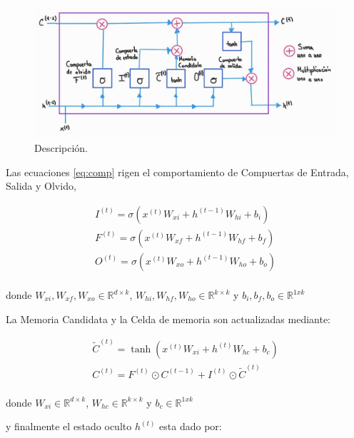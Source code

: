 \begin{figure}[ht!]
\centering
\includegraphics[width=1.0 \textwidth]{Chapters/2. Transformer/Figures/rnn/lstm.jpg}
\caption{Descripción.}
\label{fig:rnn_lstm}
\end{figure}

Las ecuaciones \ref{eq:comp} rigen el comportamiento de Compuertas de Entrada, Salida y Olvido,

\begin{equation}
    \begin{split}
        I^{(t)} =  \sigma(x^{(t)} W_{xi} + h^{(t-1)} W_{hi} + b_i)\\
        F^{(t)} =  \sigma(x^{(t)} W_{xf} + h^{(t-1)} W_{hf} + b_f)\\
        O^{(t)} =  \sigma(x^{(t)} W_{xo} + h^{(t-1)} W_{ho} + b_o)\\
    \end{split}
    \label{eq:comp}
\end{equation}

\noindent donde $W_{xi}, W_{xf}, W_{xo} \in \mathbb{R}^{d \times k}$,
$W_{hi}, W_{hf}, W_{ho} \in \mathbb{R}^{k \times k}$ y $b_i, b_f, b_o \in \mathbb{R}^{1xk}$

La Memoria Candidata y la Celda de memoria son actualizadas mediante:

\begin{equation}
    \begin{split}
        \tilde C^{(t)} =  \tanh(x^{(t)} W_{xi} + h^{(t)} W_{hc} + b_c)\\
        C^{(t)} =  F^{(t)} \odot C^{(t-1)} + I^{(t)} \odot \tilde C^{(t)} \\
    \end{split}
\end{equation}

\noindent donde $W_{xi} \in \mathbb{R}^{d \times k}$,
$W_{hc} \in \mathbb{R}^{k \times k}$ y $b_c \in \mathbb{R}^{1xk}$

\noindent y finalmente el estado oculto $h^{(t)}$ esta dado por:


